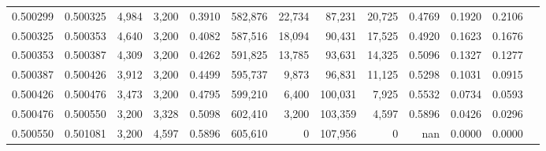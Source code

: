 \begin{tabular}{rrrrrrrrrrrrr}
0.500299 & 0.500325 &  4,984 & 3,200 &                                     0.3910 & 582,876 &  22,734 &  87,231 &  20,725 & 0.4769 & 0.1920 & 0.2106 \\
0.500325 & 0.500353 &  4,640 & 3,200 &                                     0.4082 & 587,516 &  18,094 &  90,431 &  17,525 & 0.4920 & 0.1623 & 0.1676 \\
0.500353 & 0.500387 &  4,309 & 3,200 &                                     0.4262 & 591,825 &  13,785 &  93,631 &  14,325 & 0.5096 & 0.1327 & 0.1277 \\
0.500387 & 0.500426 &  3,912 & 3,200 &                                     0.4499 & 595,737 &   9,873 &  96,831 &  11,125 & 0.5298 & 0.1031 & 0.0915 \\
0.500426 & 0.500476 &  3,473 & 3,200 &                                     0.4795 & 599,210 &   6,400 & 100,031 &   7,925 & 0.5532 & 0.0734 & 0.0593 \\
0.500476 & 0.500550 &  3,200 & 3,328 &                                     0.5098 & 602,410 &   3,200 & 103,359 &   4,597 & 0.5896 & 0.0426 & 0.0296 \\
0.500550 & 0.501081 &  3,200 & 4,597 &                                     0.5896 & 605,610 &       0 & 107,956 &       0 &    nan & 0.0000 & 0.0000 \\
\bottomrule
\end{tabular}
